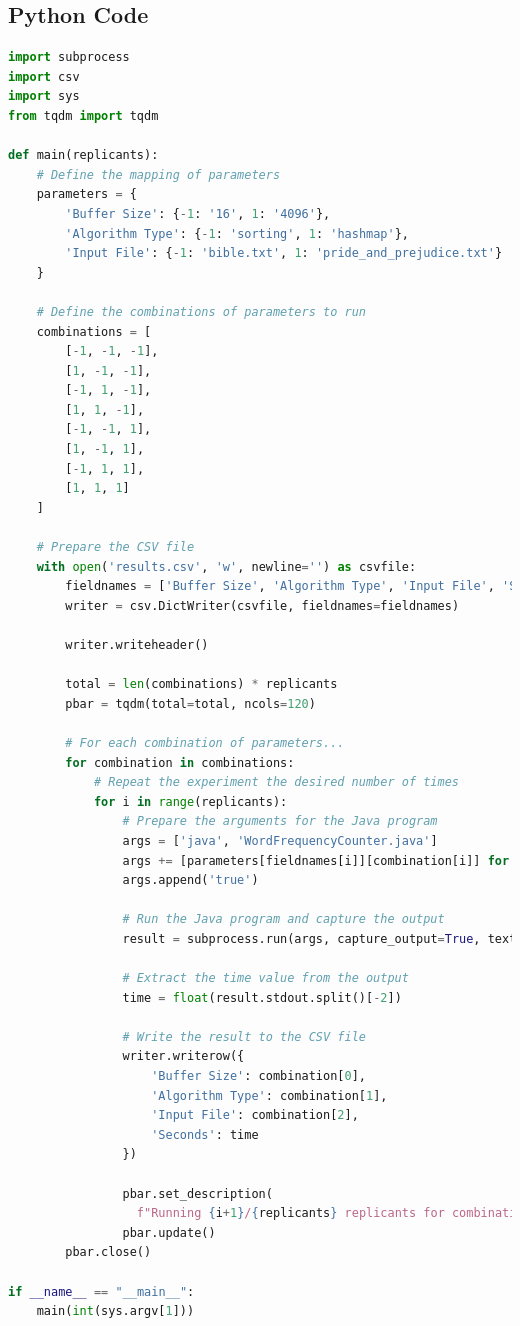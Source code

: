 \documentclass{article}
\begin{document}
  \subsection{Python Code}
  \begin{lstlisting}[language=Python, 
    basicstyle=\ttfamily\scriptsize, 
    numbers=none, 
    frame=single,
    showspaces=false,
    caption={Source Code for the run\_java\_experiments.py file}]
import subprocess
import csv
import sys
from tqdm import tqdm

def main(replicants):
    # Define the mapping of parameters
    parameters = {
        'Buffer Size': {-1: '16', 1: '4096'},
        'Algorithm Type': {-1: 'sorting', 1: 'hashmap'},
        'Input File': {-1: 'bible.txt', 1: 'pride_and_prejudice.txt'}
    }

    # Define the combinations of parameters to run
    combinations = [
        [-1, -1, -1],
        [1, -1, -1],
        [-1, 1, -1],
        [1, 1, -1],
        [-1, -1, 1],
        [1, -1, 1],
        [-1, 1, 1],
        [1, 1, 1]
    ]

    # Prepare the CSV file
    with open('results.csv', 'w', newline='') as csvfile:
        fieldnames = ['Buffer Size', 'Algorithm Type', 'Input File', 'Seconds']
        writer = csv.DictWriter(csvfile, fieldnames=fieldnames)

        writer.writeheader()

        total = len(combinations) * replicants
        pbar = tqdm(total=total, ncols=120)

        # For each combination of parameters...
        for combination in combinations:
            # Repeat the experiment the desired number of times
            for i in range(replicants):
                # Prepare the arguments for the Java program
                args = ['java', 'WordFrequencyCounter.java']
                args += [parameters[fieldnames[i]][combination[i]] for i in range(len(combination))]
                args.append('true')

                # Run the Java program and capture the output
                result = subprocess.run(args, capture_output=True, text=True)

                # Extract the time value from the output
                time = float(result.stdout.split()[-2])

                # Write the result to the CSV file
                writer.writerow({
                    'Buffer Size': combination[0],
                    'Algorithm Type': combination[1],
                    'Input File': combination[2],
                    'Seconds': time
                })

                pbar.set_description(
                  f"Running {i+1}/{replicants} replicants for combination {combination}")
                pbar.update()
        pbar.close()

if __name__ == "__main__":
    main(int(sys.argv[1]))  
  \end{lstlisting}

\end{document}
